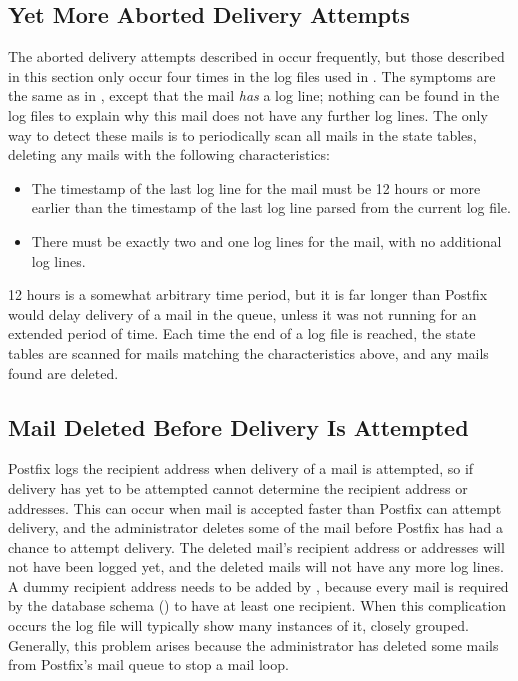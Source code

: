 \subsection{Yet More Aborted Delivery Attempts}

\label{yet more aborted delivery attempts}

The aborted delivery attempts described in  occur frequently, but those described in this section only occur
four times in the \numberOFlogFILES{} log files used in
.  The symptoms are the same as in
, except that the mail \textit{has\/}
a  log line; nothing can be found in the log files to
explain why this mail does not have any further log lines.  The only way to
detect these mails is to periodically scan all mails in the state tables,
deleting any mails with the following characteristics:

\begin{itemize}

    \item The timestamp of the last log line for the mail must be 12 hours
        or more earlier than the timestamp of the last log line parsed from
        the current log file.

    \item There must be exactly two  and one 
        log lines for the mail, with no additional log lines.

\end{itemize}

12 hours is a somewhat arbitrary time period, but it is far longer than
Postfix would delay delivery of a mail in the queue, unless it was not
running for an extended period of time.  Each time the end of a log file is
reached, the state tables are scanned for mails matching the
characteristics above, and any mails found are deleted.

\subsection{Mail Deleted Before Delivery Is Attempted}

\label{Mail deleted before delivery is attempted}

Postfix logs the recipient address when delivery of a mail is attempted, so
if delivery has yet to be attempted \parsername{} cannot determine the
recipient address or addresses.  This can occur when mail is accepted
faster than Postfix can attempt delivery, and the administrator deletes
some of the mail before Postfix has had a chance to attempt delivery.  The
deleted mail's recipient address or addresses will not have been logged
yet, and the deleted mails will not have any more log lines.  A dummy
recipient address needs to be added by \parsername{}, because every mail is
required by the database schema () to have at
least one recipient.  When this complication occurs the log file will
typically show many instances of it, closely grouped.  Generally, this
problem arises because the administrator has deleted some mails from
Postfix's mail queue to stop a mail loop.

